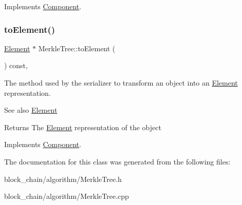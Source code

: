 Implements \mbox{\hyperlink{classComponent_a2ded18881226d0077dc393e0e9304bb1}{Component}}.

\mbox{\label{classMerkleTree_a4e72819c6cbc49ed8ce092f464711a5f}} 
\subsubsection{\texorpdfstring{to\+Element()}{toElement()}}
{\footnotesize\ttfamily \mbox{\hyperlink{classElement}{Element}} $\ast$ Merkle\+Tree\+::to\+Element (\begin{DoxyParamCaption}{ }\end{DoxyParamCaption}) const\hspace{0.3cm}{\ttfamily [override]}, {\ttfamily [virtual]}}

The method used by the serializer to transform an object into an \mbox{\hyperlink{classElement}{Element}} representation. \begin{DoxySeeAlso}{See also}
\mbox{\hyperlink{classElement}{Element}}
\end{DoxySeeAlso}
\begin{DoxyReturn}{Returns}
The \mbox{\hyperlink{classElement}{Element}} representation of the object 
\end{DoxyReturn}


Implements \mbox{\hyperlink{classComponent_a3e63d8c993e417a4af3f56d65ebfc7ea}{Component}}.



The documentation for this class was generated from the following files\+:\begin{DoxyCompactItemize}
\item 
block\+\_\+chain/algorithm/Merkle\+Tree.\+h\item 
block\+\_\+chain/algorithm/Merkle\+Tree.\+cpp\end{DoxyCompactItemize}
